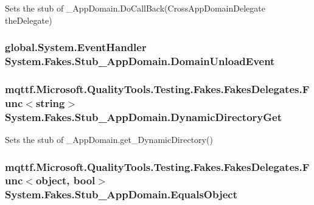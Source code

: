 Sets the stub of \-\_\-\-App\-Domain.\-Do\-Call\-Back(\-Cross\-App\-Domain\-Delegate the\-Delegate)

\hypertarget{class_system_1_1_fakes_1_1_stub___app_domain_af817a7f9d7c23073f7915a2e8bce2a85}{
\subsubsection[{Domain\-Unload\-Event}]{\setlength{\rightskip}{0pt plus 5cm}global.\-System.\-Event\-Handler System.\-Fakes.\-Stub\-\_\-\-App\-Domain.\-Domain\-Unload\-Event}}\label{class_system_1_1_fakes_1_1_stub___app_domain_af817a7f9d7c23073f7915a2e8bce2a85}
\hypertarget{class_system_1_1_fakes_1_1_stub___app_domain_aa173b744639579ccbb39315d2b1aff62}{
\subsubsection[{Dynamic\-Directory\-Get}]{\setlength{\rightskip}{0pt plus 5cm}mqttf.\-Microsoft.\-Quality\-Tools.\-Testing.\-Fakes.\-Fakes\-Delegates.\-Func$<$string$>$ System.\-Fakes.\-Stub\-\_\-\-App\-Domain.\-Dynamic\-Directory\-Get}}\label{class_system_1_1_fakes_1_1_stub___app_domain_aa173b744639579ccbb39315d2b1aff62}


Sets the stub of \-\_\-\-App\-Domain.\-get\-\_\-\-Dynamic\-Directory()

\hypertarget{class_system_1_1_fakes_1_1_stub___app_domain_a4d0da4288f2c8a9fc2bd489c4c89afda}{
\subsubsection[{Equals\-Object}]{\setlength{\rightskip}{0pt plus 5cm}mqttf.\-Microsoft.\-Quality\-Tools.\-Testing.\-Fakes.\-Fakes\-Delegates.\-Func$<$object, bool$>$ System.\-Fakes.\-Stub\-\_\-\-App\-Domain.\-Equals\-Object}}\label{class_system_1_1_fakes_1_1_stub___app_domain_a4d0da4288f2c8a9fc2bd489c4c89afda}


